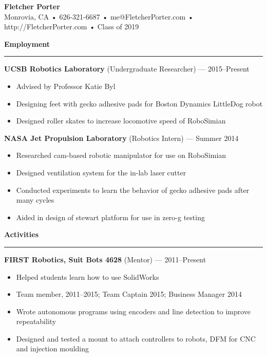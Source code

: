 \documentclass[12pt, oneside]{article}
\newcommand{\titlestyle}[1] {
	{\fontsize{50pt}{1em}\selectfont \bf \textcolor{new_red}{#1}} \\
}
\newcommand{\headingstyleJobs}[1] {
	{\fontsize{20pt}{1em}\selectfont \bf \textcolor{new_red}{#1}}
	\textcolor{new_red}{\rule{3.25in}{0.5pt}} \vspace{3pt}
}
\newcommand{\infostyle}[1] {
	{\fontsize{10pt}{1em}\selectfont #1} \\ \vspace{9pt}
}
\newcommand{\jobtitle}[2] {
	{\bf #1} {#2} \vspace{-10pt} \\
}
\begin{document}
\begin{flushleft}


\titlestyle{Fletcher Porter}
\infostyle{Monrovia, CA • 626-321-6687 • me@FletcherPorter.com • http://FletcherPorter.com • Class of 2019}

\headingstyleJobs{Employment}

\jobtitle{UCSB Robotics Laboratory}{(Undergraduate Researcher) — 2015–Present}
\begin{itemize}
	\item Advised by Professor Katie Byl
	\item Designing feet with gecko adhesive pads for Boston Dynamics LittleDog robot
	\item Designed roller skates to increase locomotive speed of RoboSimian
\end{itemize}\vspace{-7pt}

\jobtitle{NASA Jet Propulsion Laboratory}{(Robotics Intern) — Summer 2014}
\begin{itemize}
	\item Researched cam-based robotic manipulator for use on RoboSimian
	\item Designed ventilation system for the in-lab laser cutter
	\item Conducted experiments to learn the behavior of gecko adhesive pads after many cycles
	\item Aided in design of stewart platform for use in zero-g testing
\end{itemize}

\headingstyleJobs{Activities}

\jobtitle{FIRST Robotics, Suit Bots 4628}{(Mentor) — 2011–Present}
\begin{itemize}
	\item Helped students learn how to use SolidWorks \\
	\item Team member, 2011–2015; Team Captain 2015; Business Manager 2014 \\
	\item Wrote autonomous programs using encoders and line detection to improve repeatability \\
	\item Designed and tested a mount to attach controllers to robots, DFM for CNC and injection moulding \\
\end{itemize}\vspace{-7pt}


\end{flushleft}
\end{document}
